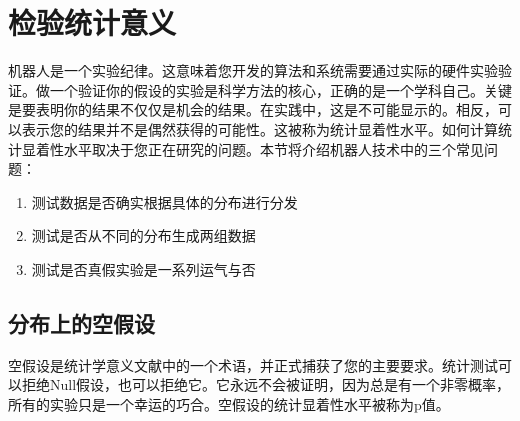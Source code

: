 \section{检验统计意义}
\label{sec:stattest}
机器人是一个实验纪律。这意味着您开发的算法和系统需要通过实际的硬件实验验证。做一个验证你的假设的实验是科学方法的核心，正确的是一个学科自己。关键是要表明你的结果不仅仅是机会的结果。在实践中，这是不可能显示的。相反，可以表示您的结果并不是偶然获得的可能性。这被称为统计显着性水平。如何计算统计显着性水平取决于您正在研究的问题。本节将介绍机器人技术中的三个常见问题：

\begin{enumerate}

\item 测试数据是否确实根据具体的分布进行分发
\item 测试是否从不同的分布生成两组数据
\item 测试是否真假实验是一系列运气与否
\end{enumerate}



\subsection{分布上的空假设}
空假设是统计学意义文献中的一个术语，并正式捕获了您的主要要求。统计测试可以拒绝Null假设，也可以拒绝它。它永远不会被证明，因为总是有一个非零概率，所有的实验只是一个幸运的巧合。空假设的统计显着性水平被称为p值。

